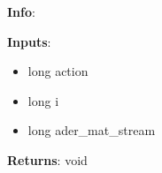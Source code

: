 \textbf{Info}:

\noindent \textbf{Inputs}:
\begin{itemize}
\item{long action}
\item{long i}
\item{long ader\_mat\_stream}
\end{itemize}

\noindent \textbf{Returns}: void
